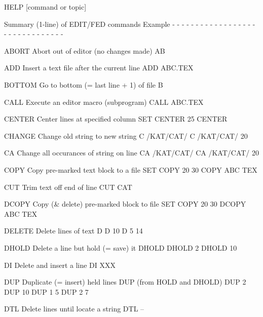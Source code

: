       HELP   [command or topic]
 
 
Summary (1-line) of EDIT/FED commands                 Example
- - - - - - - - - - - - - - - - - - - - - - - - - - - - - - -
 
ABORT     Abort out of editor (no changes made)       AB
 
ADD       Insert a text file after the current line   ADD ABC.TEX
 
BOTTOM    Go to bottom (= last line + 1) of file      B
 
CALL      Execute an editor macro (subprogram)        CALL ABC.TEX
 
CENTER    Center lines at specified column            SET CENTER 25
                                                      CENTER
 
CHANGE    Change old string to new string             C /KAT/CAT/
                                                      C /KAT/CAT/ 20
 
CA        Change all occurances of string on line     CA /KAT/CAT/
                                                      CA /KAT/CAT/ 20
 
COPY      Copy pre-marked text block to a file        SET COPY 20 30
                                                      COPY ABC TEX
 
CUT       Trim text off end of line                   CUT CAT
 
DCOPY     Copy (& delete) pre-marked block to file    SET COPY 20 30
                                                      DCOPY ABC TEX
 
DELETE    Delete lines of text                        D
                                                      D 10
                                                      D 5 14
 
DHOLD     Delete a line but hold (= save) it          DHOLD
                                                      DHOLD 2
                                                      DHOLD 10
 
DI        Delete and insert a line                    DI XXX
 
DUP       Duplicate (= insert) held lines             DUP
          (from HOLD and DHOLD)                       DUP 2
                                                      DUP 10
                                                      DUP 1 5
                                                      DUP 2 7
 
DTL       Delete lines until locate a string          DTL --
 
